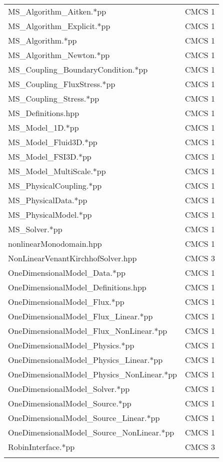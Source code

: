 \documentclass[10p]{article}
\theoremstyle{definition}
\begin{document}
\begin{landscape}
\begin{table}[!h]
\begin{multicols}{3}
\begin{xtabular}{
p{0.36\textwidth}<{}|
p{0.1\textwidth}<{}
}
MS\_Algorithm\_Aitken.*pp & CMCS 1\\
MS\_Algorithm\_Explicit.*pp & CMCS 1\\
MS\_Algorithm.*pp & CMCS 1\\
MS\_Algorithm\_Newton.*pp & CMCS 1\\
MS\_Coupling\_BoundaryCondition.*pp & CMCS 1\\
MS\_Coupling\_FluxStress.*pp & CMCS 1\\
MS\_Coupling\_Stress.*pp & CMCS 1\\
MS\_Definitions.hpp & CMCS 1\\
MS\_Model\_1D.*pp & CMCS 1\\
MS\_Model\_Fluid3D.*pp & CMCS 1\\
MS\_Model\_FSI3D.*pp & CMCS 1\\
MS\_Model\_MultiScale.*pp & CMCS 1\\
MS\_PhysicalCoupling.*pp & CMCS 1\\
MS\_PhysicalData.*pp & CMCS 1\\
MS\_PhysicalModel.*pp & CMCS 1\\
MS\_Solver.*pp & CMCS 1\\
nonlinearMonodomain.hpp & CMCS 1\\
NonLinearVenantKirchhofSolver.hpp & CMCS 3\\
OneDimensionalModel\_Data.*pp & CMCS 1\\
OneDimensionalModel\_Definitions.hpp & CMCS 1\\
OneDimensionalModel\_Flux.*pp & CMCS 1\\
OneDimensionalModel\_Flux\_Linear.*pp & CMCS 1\\
OneDimensionalModel\_Flux\_NonLinear.*pp & CMCS 1\\
OneDimensionalModel\_Physics.*pp & CMCS 1\\
OneDimensionalModel\_Physics\_Linear.*pp & CMCS 1\\
OneDimensionalModel\_Physics\_NonLinear.*pp & CMCS 1\\
OneDimensionalModel\_Solver.*pp & CMCS 1\\
OneDimensionalModel\_Source.*pp & CMCS 1\\
OneDimensionalModel\_Source\_Linear.*pp & CMCS 1\\
OneDimensionalModel\_Source\_NonLinear.*pp & CMCS 1\\
RobinInterface.*pp & CMCS 3\\
& \\
\end{xtabular}
\begin{xtabular}{
p{0.36\textwidth}<{}|
p{0.10\textwidth}<{}
}

\end{xtabular}
\end{multicols}
\end{table}
\end{landscape}
\end{document}
